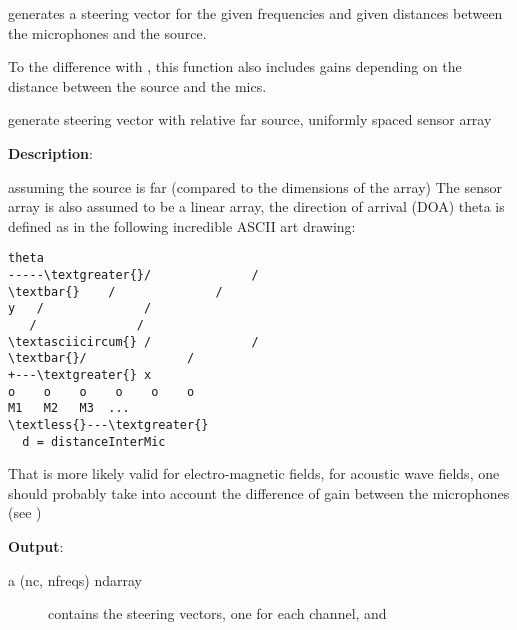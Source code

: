 \documentclass[letterpaper,10pt,english]{sphinxmanual}
\begin{document}

\begin{fulllineitems}
\label{reference/spatial:pyfasst.spatial.steering_vectors.gen_steer_vec_acous}
generates a steering vector for the given frequencies and given
distances between the microphones and the source.

To the difference with
{\hyperref[reference/spatial:pyfasst.spatial.steering_vectors.gen_steer_vec_far_src_uniform_linear_array]{}}, this function
also includes gains depending on the distance between the source and
the mics.

\end{fulllineitems}


\begin{fulllineitems}
\label{reference/spatial:pyfasst.spatial.steering_vectors.gen_steer_vec_far_src_uniform_linear_array}
generate steering vector with relative far source,
uniformly spaced sensor array

\textbf{Description}:

assuming the source is far (compared to the dimensions of the array)
The sensor array is also assumed to be a linear array, the direction of
arrival (DOA) theta is defined as in the following incredible ASCII
art drawing:

\begin{Verbatim}[commandchars=\\\{\}]
  theta
-----\textgreater{}/              /
\textbar{}    /              /
y   /              /
   /              /
\textasciicircum{} /              /
\textbar{}/              /
+---\textgreater{} x
o    o    o    o    o    o
M1   M2   M3  ...
\textless{}---\textgreater{}
  d = distanceInterMic
\end{Verbatim}

That is more likely valid for electro-magnetic fields, for acoustic
wave fields, one should probably take into account the difference of
gain between the microphones (see {\hyperref[reference/spatial:pyfasst.spatial.steering_vectors.gen_steer_vec_acous]{}} )

\textbf{Output}:
\begin{description}
\item[{a (nc, nfreqs) ndarray}] \leavevmode
contains the steering vectors, one for each channel, and

\end{description}

\end{fulllineitems}
\end{document}
